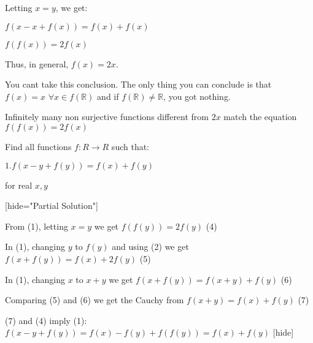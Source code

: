 \begin{solution}
	\begin{tcolorbox} Letting $x = y$, we get:

$f(x - x + f(x)) = f(x) + f(x)$

$f(f(x)) = 2f(x)$

Thus, in general, $f(x) = 2x$. \end{tcolorbox}

You cant take this conclusion.
The only thing you can conclude is that $f(x)=x$ $\forall x\in f(\mathbb R)$ and if $f(\mathbb R)\ne\mathbb R$, you got nothing.

Infinitely many non surjective functions different from $2x$ match the equation $f(f(x))=2f(x)$
\end{solution}



\begin{solution}
	\begin{tcolorbox}Find all functions $ f:R\rightarrow R $ such that:

$1.f(x-y+f(y))=f(x)+f(y) $

    for real $x,y$\end{tcolorbox}

[hide="Partial Solution"]

From (1), letting  $x=y$ we get $f(f(y))=2f(y)$ (4)

In (1), changing $y$ to $f(y)$ and using (2) we get $f(x+f(y))=f(x)+2f(y)$   (5)

In (1), changing $x$ to $x+y$ we get $f(x+f(y))=f(x+y)+f(y)$    (6)

Comparing (5) and (6) we get the Cauchy from $f(x+y)=f(x)+f(y)$   (7)

(7) and (4) imply (1): $f(x-y+f(y))=f(x)-f(y)+f(f(y))=f(x)+f(y)$
[\/hide]
\end{solution}






